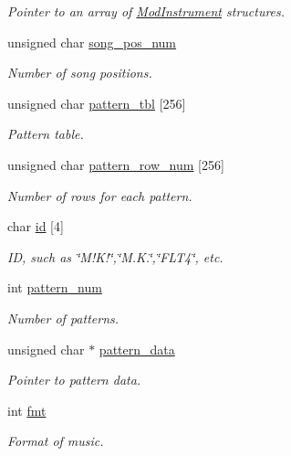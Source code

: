 \begin{DoxyCompactItemize}
\begin{DoxyCompactList}\small\item\em Pointer to an array of \hyperlink{structModInstrument}{Mod\+Instrument} structures. \end{DoxyCompactList}\item 
unsigned char \hyperlink{structModMusic_a314b376f9b8b67475b70d1e3579da361}{song\+\_\+pos\+\_\+num}
\begin{DoxyCompactList}\small\item\em Number of song positions. \end{DoxyCompactList}\item 
unsigned char \hyperlink{structModMusic_a48139937a46f8938045f3852dab34b33}{pattern\+\_\+tbl} \mbox{[}256\mbox{]}
\begin{DoxyCompactList}\small\item\em Pattern table. \end{DoxyCompactList}\item 
unsigned char \hyperlink{structModMusic_a4a84e33e38cc3b0734b3901276e8cf38}{pattern\+\_\+row\+\_\+num} \mbox{[}256\mbox{]}
\begin{DoxyCompactList}\small\item\em Number of rows for each pattern. \end{DoxyCompactList}\item 
char \hyperlink{structModMusic_a5c5d6cb058ca58e045eb51e0b036b3fb}{id} \mbox{[}4\mbox{]}
\begin{DoxyCompactList}\small\item\em ID, such as \char`\"{}\+M!\+K!\char`\"{},\char`\"{}\+M.\+K.\char`\"{},\char`\"{}\+F\+L\+T4\char`\"{}, etc. \end{DoxyCompactList}\item 
int \hyperlink{structModMusic_a94311ad25e92db0711cc9dfb5f25103d}{pattern\+\_\+num}
\begin{DoxyCompactList}\small\item\em Number of patterns. \end{DoxyCompactList}\item 
unsigned char $\ast$ \hyperlink{structModMusic_a4f279f645c007e434d897b480510e748}{pattern\+\_\+data}
\begin{DoxyCompactList}\small\item\em Pointer to pattern data. \end{DoxyCompactList}\item 
int \hyperlink{structModMusic_a8333fbe2d5747ef9397d371886d00a5c}{fmt}
\begin{DoxyCompactList}\small\item\em Format of music. \end{DoxyCompactList}\item 

\end{DoxyCompactItemize}
